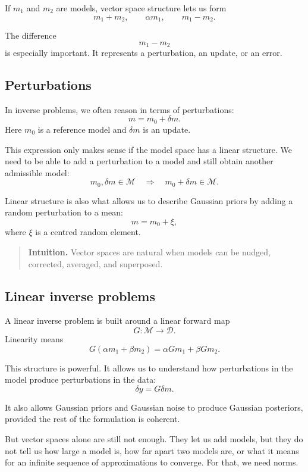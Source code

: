 \documentclass[11pt,a4paper]{book}
\newenvironment{intuition}
  {\begin{quote}\textbf{Intuition.}}
  {\end{quote}}
\newcommand{\M}{\mathcal{M}}      %
\newcommand{\D}{\mathcal{D}}      %
\newcommand{\G}{G}
\begin{document}
If $m_1$ and $m_2$ are models, vector space structure lets us form
\[
    m_1+m_2,
    \qquad
    \alpha m_1,
    \qquad
    m_1-m_2.
\]

The difference
\[
    m_1-m_2
\]
is especially important. It represents a perturbation, an update, or an error.

\subsection{Perturbations}

In inverse problems, we often reason in terms of perturbations:
\[
    m = m_0+\delta m.
\]
Here $m_0$ is a reference model and $\delta m$ is an update.

This expression only makes sense if the model space has a linear structure.
We need to be able to add a perturbation to a model and still obtain another
admissible model:
\[
    m_0,\delta m\in\M
    \quad\Longrightarrow\quad
    m_0+\delta m\in\M.
\]

Linear structure is also what allows us to describe Gaussian priors by adding a
random perturbation to a mean:
\[
    m = m_0 + \xi,
\]
where $\xi$ is a centred random element.

\begin{intuition}
Vector spaces are natural when models can be nudged, corrected, averaged, and
superposed.
\end{intuition}

\subsection{Linear inverse problems}

A linear inverse problem is built around a linear forward map
\[
    \G:\M\to\D.
\]
Linearity means
\[
    \G(\alpha m_1+\beta m_2)
    =
    \alpha \G m_1+\beta \G m_2.
\]

This structure is powerful. It allows us to understand how perturbations in the
model produce perturbations in the data:
\[
    \delta y = \G \delta m.
\]

It also allows Gaussian priors and Gaussian noise to produce Gaussian
posteriors, provided the rest of the formulation is coherent.

But vector spaces alone are still not enough. They let us add models, but they
do not tell us how large a model is, how far apart two models are, or what it
means for an infinite sequence of approximations to converge. For that, we need
norms.
\end{document}
